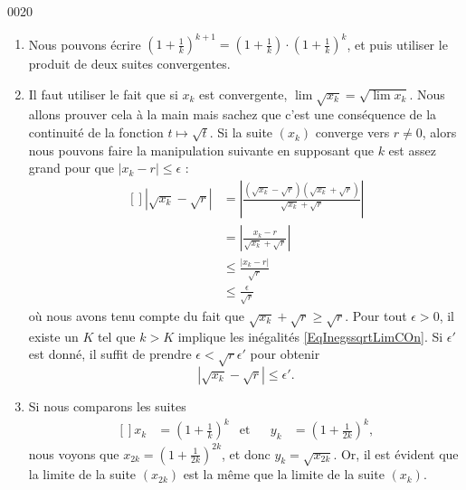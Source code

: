 \begin{corrige}{0020}
\begin{enumerate}
\begin{enumerate}
\item Nous pouvons écrire $\left( 1+\frac{1}{ k } \right)^{k+1}=\left( 1+\frac{1}{ k } \right)\cdot\left( 1+\frac{1}{ k } \right)^{k}$, et puis utiliser le produit de deux suites convergentes.
\item Il faut utiliser le fait que si $x_k$ est convergente, $\lim\sqrt{x_k}=\sqrt{\lim x_k}$. Nous allons prouver cela \og à la main\fg{}  mais sachez que c'est une conséquence de la continuité de la fonction $t\mapsto\sqrt{t}$. Si la suite $(x_k)$ converge vers $r\neq 0$, alors nous pouvons faire la manipulation suivante en supposant que $k$ est assez grand pour que $| x_k-r |\leq\epsilon$ :
\begin{equation}		\label{EqInegssqrtLimCOn}
	\begin{aligned}[]
		| \sqrt{x_k}-\sqrt{r} |	&=\left|  \frac{ (\sqrt{x_k}-\sqrt{r})(\sqrt{x_k}+\sqrt{r}) }{ \sqrt{x_k}+\sqrt{r} }  \right|\\
					&=\left| \frac{ x_k-r }{ \sqrt{x_k}+\sqrt{r} } \right| \\
					&\leq\frac{ | x_k-r | }{ \sqrt{r} }\\
					&\leq \frac{ \epsilon }{ \sqrt{r} }
	\end{aligned}
\end{equation}
où nous avons tenu compte du fait que $\sqrt{x_k}+\sqrt{r}\geq\sqrt{r}$. Pour tout $\epsilon>0$, il existe un $K$ tel que $k>K$ implique les inégalités \eqref{EqInegssqrtLimCOn}. Si $\epsilon'$ est donné, il suffit de prendre $\epsilon< \sqrt{r}\epsilon'$ pour obtenir
\begin{equation}
	| \sqrt{x_k}-\sqrt{r} |\leq\epsilon'.
\end{equation}
\item
Si nous comparons les suites
\begin{equation}
	\begin{aligned}[]
		x_k&=\left( 1+\frac{1}{ k } \right)^k&\text{et}&&y_k&=\left( 1+\frac{1}{ 2k } \right)^k,
	\end{aligned}
\end{equation}
nous voyons que $x_{2k}=\left( 1+\frac{1}{ 2k } \right)^{2k}$, et donc $y_k=\sqrt{x_{2k}}$. Or, il est évident que la limite de la suite $(x_{2k})$ est la même que la limite de la suite $(x_k)$.


\end{enumerate}
\end{enumerate}
\end{corrige}
